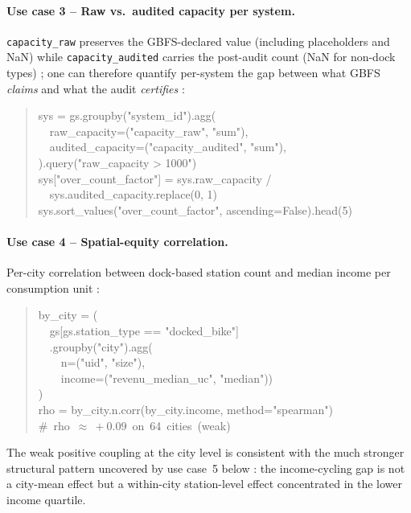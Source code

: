\documentclass[11pt,a4paper]{article}
\begin{document}
\paragraph{Use case 3 -- Raw vs.\ audited capacity per system.}
\texttt{capacity\_raw} preserves the GBFS-declared value (including
placeholders and NaN) while \texttt{capacity\_audited} carries the
post-audit count (NaN for non-dock types) ; one can therefore
quantify per-system the gap between what GBFS \emph{claims} and
what the audit \emph{certifies} :
\begin{quote}\small\ttfamily
sys = gs.groupby("system\_id").agg(\\
\ \ raw\_capacity=("capacity\_raw", "sum"),\\
\ \ audited\_capacity=("capacity\_audited", "sum"),\\
).query("raw\_capacity > 1000")\\
sys["over\_count\_factor"] = sys.raw\_capacity / \\
\ \ sys.audited\_capacity.replace(0, 1)\\
sys.sort\_values("over\_count\_factor", ascending=False).head(5)
\end{quote}

\paragraph{Use case 4 -- Spatial-equity correlation.}
Per-city correlation between dock-based station count and median
income per consumption unit :
\begin{quote}\small\ttfamily
by\_city = (\\
\ \ gs[gs.station\_type == "docked\_bike"]\\
\ \ .groupby("city").agg(\\
\ \ \ \ n=("uid", "size"),\\
\ \ \ \ income=("revenu\_median\_uc", "median"))\\
)\\
rho = by\_city.n.corr(by\_city.income, method="spearman")\\
\#\ rho\ $\approx\ +0.09$\ on\ 64\ cities\ (weak)
\end{quote}
The weak positive coupling at the city level is consistent with the
much stronger structural pattern uncovered by use case~5 below : the
income-cycling gap is not a city-mean effect but a within-city
station-level effect concentrated in the lower income quartile.
\end{document}
